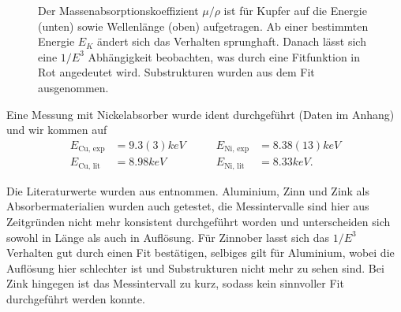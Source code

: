 \begin{figure}[H]
	\centering
	\caption{Der Massenabsorptionskoeffizient \( \mu/\rho \) ist für Kupfer auf die Energie (unten) sowie Wellenlänge (oben) aufgetragen. Ab einer bestimmten Energie \( E_K \) ändert sich das Verhalten sprunghaft. Danach lässt sich eine \( 1/E^3 \) Abhängigkeit beobachten, was durch eine Fitfunktion in Rot angedeutet wird. Substrukturen wurden aus dem Fit ausgenommen.}
	\label{fig:Ex4_3}
\end{figure}

Eine Messung mit Nickelabsorber wurde ident durchgeführt (Daten im Anhang) und wir kommen auf
\begin{align*}
	E_{\text{Cu, exp}} &= 9.3(3) \unit{keV} \qquad &E_{\text{Ni, exp}} &= 8.38(13) \unit{keV} \\
	E_{\text{Cu, lit}} &= 8.98 \unit{keV}  \qquad &E_{\text{Ni, lit}} &=8.33 \unit{keV}.
\end{align*}

Die Literaturwerte wurden aus \autocite{nist_Daten} entnommen.
Aluminium, Zinn und Zink als Absorbermaterialien wurden auch getestet, die Messintervalle sind hier aus Zeitgründen nicht mehr konsistent durchgeführt worden und unterscheiden sich sowohl in Länge als auch in Auflösung. Für Zinnober lasst sich das $1/E^3$ Verhalten gut durch einen Fit bestätigen, selbiges gilt für Aluminium, wobei die Auflösung hier schlechter ist und Substrukturen nicht mehr zu sehen sind. Bei Zink hingegen ist das Messintervall zu kurz, sodass kein sinnvoller Fit durchgeführt werden konnte.
	